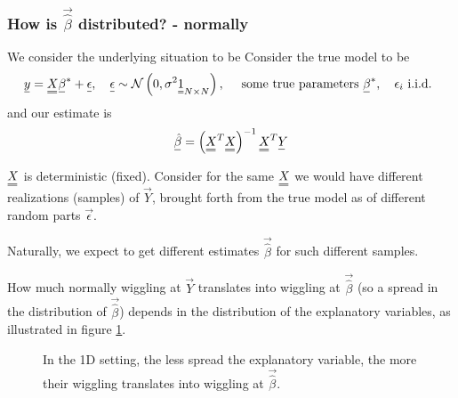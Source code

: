 \subsubsection{How is $\vec{\hat{\beta}}$ distributed? - normally}
We consider the underlying situation to be
Consider the true model to be
\begin{equation}
    \vec{y}=\mat{X} \vec{\beta}^*+\vec{\epsilon}, \quad \vec{\epsilon} \sim \mathcal{N}\left(0, \sigma^2 \mat{1}_{N \times N}\right), \quad \text { some true parameters } \vec{\beta}^{*}, \quad \epsilon_i \text { i.i.d. }
\end{equation}
and our estimate is
\begin{equation}
    \vec{\hat{\beta}}=\left(\mat{X}^T \mat{X}\right)^{-1} \mat{X}^T \vec{Y}
\end{equation}

$\mat{X}$ is deterministic (fixed). Consider for the same $\mat{X}$ we would 
have different realizations (samples) of $\vec{Y}$, brought forth
from the true model as of different random parts $\vec{\epsilon}$.

Naturally, we expect to get different estimates $\vec{\hat{\beta}}$ for such
different samples.




How much normally wiggling at $\vec{Y}$ translates into wiggling at $\vec{\hat{\beta}}$ (so a spread
in the distribution of $\vec{\hat{\beta}}$) depends in the distribution of the explanatory variables,
as illustrated in figure \ref{fig:uncertainty_beta_x}.

\begin{figure}[!htb]
 \centering
 \hfill
 \caption{In the 1D setting, the less spread the explanatory variable, the more their wiggling translates into wiggling at $\vec{\hat{\beta}}$.}
 \label{fig:uncertainty_beta_x}
\end{figure}

